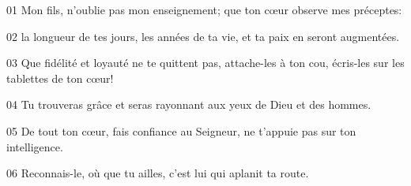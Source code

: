 01 Mon fils, n’oublie pas mon enseignement; que ton cœur observe mes préceptes:

02 la longueur de tes jours, les années de ta vie, et ta paix en seront augmentées.

03 Que fidélité et loyauté ne te quittent pas, attache-les à ton cou, écris-les sur les tablettes de ton cœur!

04 Tu trouveras grâce et seras rayonnant aux yeux de Dieu et des hommes.

05 De tout ton cœur, fais confiance au Seigneur, ne t’appuie pas sur ton intelligence.

06 Reconnais-le, où que tu ailles, c’est lui qui aplanit ta route.
